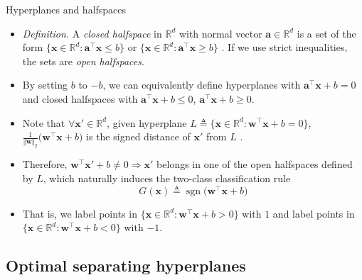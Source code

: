 \documentclass{beamer}
\numberwithin{equation}{section}
\begin{document}
\begin{frame}{Hyperplanes and halfspaces}
    \begin{itemize}
        \item
        \textit{Definition.} A \textit{closed halfspace} in $ \mathbb{R}^d $
        with normal vector $ \mathbf{a} \in \mathbb{R}^d $ is a set of the form
        $ \{\mathbf{x} \in \mathbb{R}^d : \mathbf{a}^\top\mathbf{x} \le b\} $
        or $ \{\mathbf{x} \in \mathbb{R}^d : \mathbf{a}^\top\mathbf{x} \ge
        b\} $ \cite{bv_convex_opt}. If we use strict inequalities, the sets
        are \textit{open halfspaces}.

        \item
        By setting $ b $ to $ -b $, we can equivalently define hyperplanes
        with $ \mathbf{a}^\top\mathbf{x} + b = 0 $ and closed halfspaces with
        $ \mathbf{a}^\top\mathbf{x} + b \le 0 $,
        $ \mathbf{a}^\top\mathbf{x} + b \ge 0 $.

        \item
        Note that $ \forall \mathbf{x}' \in \mathbb{R}^d $, given hyperplane
        $ L \triangleq \{\mathbf{x} \in \mathbb{R}^d :
        \mathbf{w}^\top\mathbf{x} + b = 0 \} $,
        $ \frac{1}{\Vert\mathbf{w}\Vert_2}
        \big(\mathbf{w}^\top\mathbf{x} + b\big) $ is the signed distance of
        $ \mathbf{x}' $ from $ L $ \cite{esl}.

        \item
        Therefore, $ \mathbf{w}^\top\mathbf{x}' + b \ne 0 \Rightarrow
        \mathbf{x}' $ belongs in one of the open halfspaces defined by $ L $,
        which naturally induces the two-class classification rule
        \begin{equation} \label{eq:svm_classifier}
            G(\mathbf{x}) \triangleq \operatorname{sgn}\big(
                \mathbf{w}^\top\mathbf{x} + b
            \big)
        \end{equation}

        \item
        That is, we label points in $ \{\mathbf{x} \in \mathbb{R}^d :
        \mathbf{w}^\top\mathbf{x} + b > 0\} $ with $ 1 $ and label points in
        $ \{\mathbf{x} \in \mathbb{R}^d : \mathbf{w}^\top\mathbf{x} + b < 0\} $
        with $ -1 $.
    \end{itemize}
\end{frame}

\subsection{Optimal separating hyperplanes}
\end{document}
